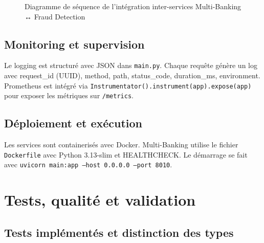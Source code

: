 \documentclass[12pt,a4paper]{extreport}
\begin{document}
\begin{figure}[H]
{
}
\caption{Diagramme de séquence de l'intégration inter-services Multi-Banking ↔ Fraud Detection}
\label{fig:sequence-diagram}
\end{figure}

\section{Monitoring et supervision}

Le logging est structuré avec JSON dans \texttt{main.py}. Chaque requête génère un log avec request\_id (UUID), method, path, status\_code, duration\_ms, environment. Prometheus est intégré via \texttt{Instrumentator().instrument(app).expose(app)} pour exposer les métriques sur \texttt{/metrics}.

\section{Déploiement et exécution}

Les services sont containerisés avec Docker. Multi-Banking utilise le fichier \texttt{Dockerfile} avec Python 3.13-slim et HEALTHCHECK. Le démarrage se fait avec \texttt{uvicorn main:app --host 0.0.0.0 --port 8010}.

\chapter{Tests, qualité et validation}

\section{Tests implémentés et distinction des types}
\end{document}
